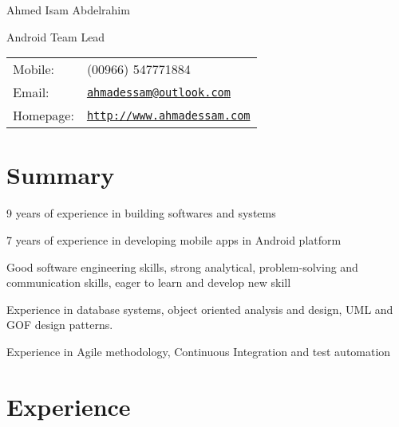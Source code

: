 \documentclass[letterpaper]{article}
\def\name{Ahmed Isam Abdelrahim}
\renewenvironment{itemize}{
  \begin{list}{}{
    \setlength{\leftmargin}{1.5em}
  }
}{
  \end{list}
}
\begin{document}
{\huge \name}


\vspace{0.10in}

\begin{minipage}{0.45\linewidth}
  Android Team Lead \\
 
\end{minipage}
\begin{minipage}{0.45\linewidth}
  \begin{tabular}{ll}
    Mobile: & (00966) 547771884 \\
    Email: & \href{mailto:ahmadessam@outlook.com}{\tt ahmadessam@outlook.com} \\
    Homepage: & \href{http://www.ahmadessam.com}{\tt http://www.ahmadessam.com} \\
  \end{tabular}
\end{minipage}

\section*{Summary}
\begin{itemize}
\item 9 years of experience in building softwares and systems
\item 7 years of experience in developing mobile apps in Android platform
\item Good software engineering skills, strong analytical, problem-solving and communication skills, eager to learn and develop new skill
\item Experience in database systems, object oriented analysis and design, UML and GOF design patterns.
\item Experience in Agile methodology, Continuous Integration and test automation
\end{itemize}


\section*{Experience}
\end{document}

